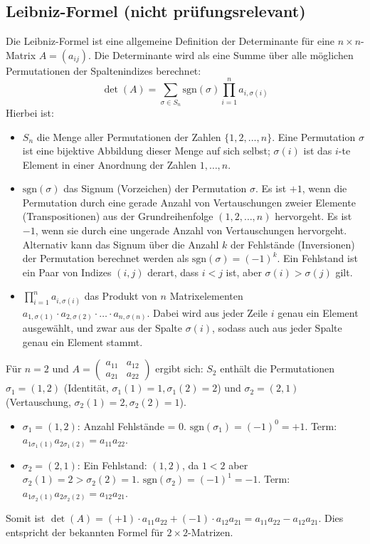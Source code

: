\subsection{Leibniz-Formel (nicht prüfungsrelevant)}

Die Leibniz-Formel ist eine allgemeine Definition der Determinante für eine $n \times n$-Matrix $A=(a_{ij})$. Die Determinante wird als eine Summe über alle möglichen Permutationen der Spaltenindizes berechnet:
\[ \det(A) = \sum_{\sigma \in S_n} \text{sgn}(\sigma) \prod_{i=1}^{n} a_{i, \sigma(i)} \]
Hierbei ist:
\begin{itemize}
    \item $S_n$ die Menge aller Permutationen der Zahlen $\{1, 2, \ldots, n\}$. Eine Permutation $\sigma$ ist eine bijektive Abbildung dieser Menge auf sich selbst; $\sigma(i)$ ist das $i$-te Element in einer Anordnung der Zahlen $1, \ldots, n$.
    \item $\text{sgn}(\sigma)$ das Signum (Vorzeichen) der Permutation $\sigma$. Es ist $+1$, wenn die Permutation durch eine gerade Anzahl von Vertauschungen zweier Elemente (Transpositionen) aus der Grundreihenfolge $(1, 2, \ldots, n)$ hervorgeht. Es ist $-1$, wenn sie durch eine ungerade Anzahl von Vertauschungen hervorgeht. Alternativ kann das Signum über die Anzahl $k$ der Fehlstände (Inversionen) der Permutation berechnet werden als $\text{sgn}(\sigma) = (-1)^k$. Ein Fehlstand ist ein Paar von Indizes $(i,j)$ derart, dass $i < j$ ist, aber $\sigma(i) > \sigma(j)$ gilt.
    \item $\prod_{i=1}^{n} a_{i, \sigma(i)}$ das Produkt von $n$ Matrixelementen $a_{1, \sigma(1)} \cdot a_{2, \sigma(2)} \cdot \ldots \cdot a_{n, \sigma(n)}$. Dabei wird aus jeder Zeile $i$ genau ein Element ausgewählt, und zwar aus der Spalte $\sigma(i)$, sodass auch aus jeder Spalte genau ein Element stammt.
\end{itemize}
Für $n=2$ und $A = \begin{pmatrix} a_{11} & a_{12} \\ a_{21} & a_{22} \end{pmatrix}$ ergibt sich: $S_2$ enthält die Permutationen $\sigma_1 = (1,2)$ (Identität, $\sigma_1(1)=1, \sigma_1(2)=2$) und $\sigma_2 = (2,1)$ (Vertauschung, $\sigma_2(1)=2, \sigma_2(2)=1$).
\begin{itemize}
    \item $\sigma_1 = (1,2)$: Anzahl Fehlstände = 0. $\text{sgn}(\sigma_1)=(-1)^0=+1$. Term: $a_{1\sigma_1(1)}a_{2\sigma_1(2)} = a_{11}a_{22}$.
    \item $\sigma_2 = (2,1)$: Ein Fehlstand: $(1,2)$, da $1<2$ aber $\sigma_2(1)=2 > \sigma_2(2)=1$. $\text{sgn}(\sigma_2)=(-1)^1=-1$. Term: $a_{1\sigma_2(1)}a_{2\sigma_2(2)} = a_{12}a_{21}$.
\end{itemize}
Somit ist $\det(A) = (+1) \cdot a_{11}a_{22} + (-1) \cdot a_{12}a_{21} = a_{11}a_{22} - a_{12}a_{21}$. Dies entspricht der bekannten Formel für $2 \times 2$-Matrizen.


